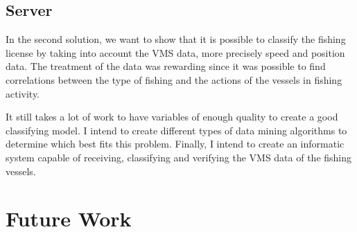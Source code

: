 
\subsection{Server} %
\label{sub:server}
In the second solution, we want to show that it is possible to classify the fishing license by taking into account the VMS data, more precisely speed and position data.
The treatment of the data was rewarding since it was possible to find correlations between the type of fishing and the actions of the vessels in fishing activity.

It still takes a lot of work to have variables of enough quality to create a good classifying model.
I intend to create different types of data mining algorithms to determine which best fits this problem.
Finally, I intend to create an informatic system capable of receiving, classifying and verifying the VMS data of the fishing vessels.


\section{Future Work} %
\label{sub:future_work}






